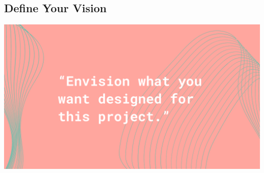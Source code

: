 \documentclass[
]{book}
\begin{document}
\hypertarget{define-your-vision}{%
\subsection{Define Your Vision}\label{define-your-vision}}

\includegraphics{images/Working-With-Graphic-Designers-Quote-2.png}
\end{document}
